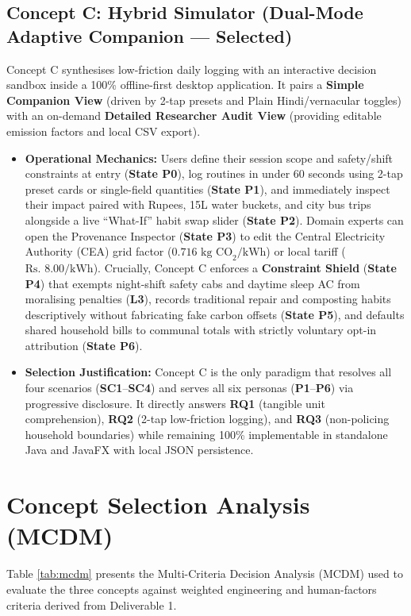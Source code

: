 \documentclass[12pt, a4paper]{article}
\begin{document}
\subsection{Concept C: Hybrid Simulator (Dual-Mode Adaptive Companion --- Selected)}
Concept C synthesises low-friction daily logging with an interactive decision sandbox inside a 100\% offline-first desktop application. It pairs a \textbf{Simple Companion View} (driven by 2-tap presets and Plain Hindi/vernacular toggles) with an on-demand \textbf{Detailed Researcher Audit View} (providing editable emission factors and local CSV export).
\begin{itemize}
    \item \textbf{Operational Mechanics:} Users define their session scope and safety/shift constraints at entry (\textbf{State P0}), log routines in under 60 seconds using 2-tap preset cards or single-field quantities (\textbf{State P1}), and immediately inspect their impact paired with Rupees, 15L water buckets, and city bus trips alongside a live ``What-If'' habit swap slider (\textbf{State P2}). Domain experts can open the Provenance Inspector (\textbf{State P3}) to edit the Central Electricity Authority (CEA) grid factor ($0.716\text{ kg CO}_2\text{/kWh}$) or local tariff ($\text{Rs. }8.00\text{/kWh}$). Crucially, Concept C enforces a \textbf{Constraint Shield} (\textbf{State P4}) that exempts night-shift safety cabs and daytime sleep AC from moralising penalties (\textbf{L3}), records traditional repair and composting habits descriptively without fabricating fake carbon offsets (\textbf{State P5}), and defaults shared household bills to communal totals with strictly voluntary opt-in attribution (\textbf{State P6}).
    \item \textbf{Selection Justification:} Concept C is the only paradigm that resolves all four scenarios (\textbf{SC1}--\textbf{SC4}) and serves all six personas (\textbf{P1}--\textbf{P6}) via progressive disclosure. It directly answers \textbf{RQ1} (tangible unit comprehension), \textbf{RQ2} (2-tap low-friction logging), and \textbf{RQ3} (non-policing household boundaries) while remaining 100\% implementable in standalone Java and JavaFX with local JSON persistence.
\end{itemize}

\section{Concept Selection Analysis (MCDM)}
Table \ref{tab:mcdm} presents the Multi-Criteria Decision Analysis (MCDM) used to evaluate the three concepts against weighted engineering and human-factors criteria derived from Deliverable 1.
\end{document}
